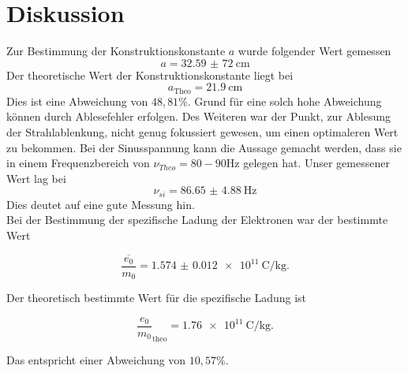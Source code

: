 \section{Diskussion}
Zur Bestimmung der Konstruktionskonstante $a$ wurde
folgender Wert gemessen
\begin{equation*}
    a = \SI{32,59(72)}{\centi\meter}
\end{equation*}
Der theoretische Wert der Konstruktionskonstante liegt bei
\begin{equation*}
   a_{\text{Theo}} = \SI{21.9}{\centi\meter}
\end{equation*}
Dies ist eine Abweichung von $48,81 \%$. Grund für eine solch hohe Abweichung
können durch Ablesefehler erfolgen. Des Weiteren war der Punkt, zur Ablesung der
Strahlablenkung, nicht genug fokussiert gewesen, um einen optimaleren Wert zu bekommen.
Bei der Sinusspannung kann die Aussage gemacht werden, dass sie in einem Frequenzbereich
von $\nu_{Theo}=80 - 90 \si{\hertz}$ gelegen hat.
Unser gemessener Wert lag bei
\begin{equation*}
  \nu_{si}= \SI{86.65(488)}{\hertz}
\end{equation*}
Dies deutet auf eine gute Messung hin.\\
Bei der Bestimmung der spezifische Ladung der Elektronen war der bestimmte Wert

\begin{equation*}
  \overline{\frac{e_0}{m_0}} = \SI{1.574(12)e11}{\coulomb\per\kilo\gram}.
\end{equation*}

Der theoretisch bestimmte Wert für die spezifische Ladung ist

\begin{equation*}
  \frac{e_0}{m_0}_\text{theo} = \SI{1.76e11}{\coulomb\per\kilo\gram}.
\end{equation*}

Das entspricht einer Abweichung von $10,57 \%$.

